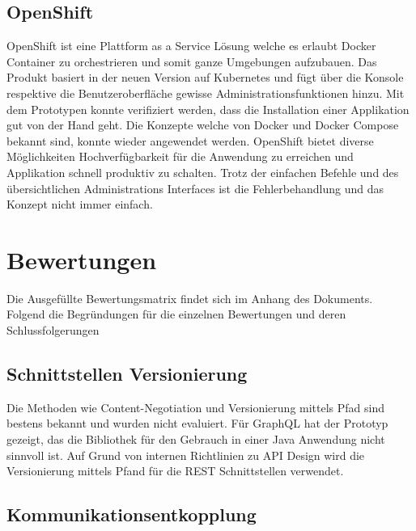\subsection{OpenShift}

OpenShift ist eine Plattform as a Service Lösung welche es erlaubt Docker Container zu orchestrieren und somit ganze Umgebungen aufzubauen. Das Produkt basiert in der neuen Version auf Kubernetes und fügt über die Konsole respektive die Benutzeroberfläche gewisse Administrationsfunktionen hinzu.  Mit dem Prototypen konnte verifiziert werden, dass die Installation einer Applikation gut von der Hand geht. Die Konzepte welche von Docker und Docker Compose bekannt sind, konnte wieder angewendet werden. OpenShift bietet diverse Möglichkeiten Hochverfügbarkeit für die Anwendung zu erreichen und Applikation schnell produktiv zu schalten. Trotz der einfachen Befehle und des übersichtlichen Administrations Interfaces ist die Fehlerbehandlung und das Konzept nicht immer einfach.

\section{Bewertungen}

Die Ausgefüllte Bewertungsmatrix findet sich im Anhang des Dokuments. Folgend die Begründungen für die einzelnen Bewertungen und deren Schlussfolgerungen

\subsection{Schnittstellen Versionierung}

Die Methoden wie Content-Negotiation und Versionierung mittels Pfad sind bestens bekannt und wurden nicht evaluiert. Für GraphQL hat der Prototyp gezeigt, das die Bibliothek für den Gebrauch in einer Java Anwendung nicht sinnvoll ist.  Auf Grund von internen Richtlinien zu API Design wird die Versionierung mittels Pfand für die REST Schnittstellen verwendet.

\subsection{Kommunikationsentkopplung}

